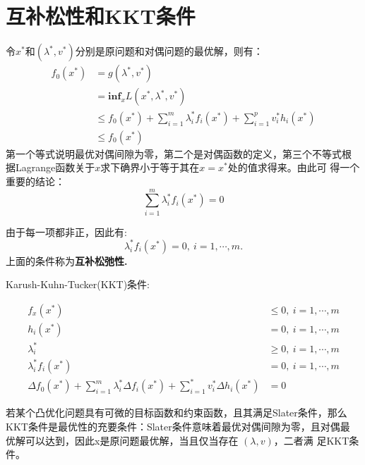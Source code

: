 \documentclass[fontset=none,oneside]{book}
\begin{document}
\section{互补松性和KKT条件}
令$x^{*}$和$(\lambda^{*},v^{*})$分别是原问题和对偶问题的最优解，则有：
\begin{equation}
\label{eq:17}
\begin{split}
f_{0}(x^{*})&=g(\lambda^{*},v^{*}) \\
       & = \mathbf{inf}_{x}L(x^{*},\lambda^{*},v^{*})\\
       & \leq
       f_{0}(x^{*})+\sum\limits_{i=1}^{m}\lambda_{i}^{*}f_{i}(x^{*})+\sum\limits_{i=1}^{p}v_{i}^{*}h_{i}(x^{*})
       \\
       & \leq f_{0}(x^{*})
\end{split}
\end{equation}
第一个等式说明最优对偶间隙为零，第二个是对偶函数的定义，第三个不等式根
据Lagrange函数关于$x$求下确界小于等于其在$x=x^{*}$处的值求得来。由此可
得一个重要的结论：
\begin{equation}
\label{eq:18}
\sum\limits_{i=1}^{m}\lambda_{i}^{*}f_{i}(x^{*})=0
\end{equation}
\begin{shaded}
由于每一项都非正，因此有:
\begin{equation}
\label{eq:19}
\lambda_{i}^{*}f_{i}(x^{*})=0,~i=1,\cdots,m.
\end{equation}
上面的条件称为{\bf{互补松弛性.}}
\end{shaded}

Karush-Kuhn-Tucker(KKT)条件:
\begin{shaded}
\begin{equation}
\label{eq:20}
\begin{split}
f_{x}(x^{*}) & \leq 0,~ i=1,\cdots,m \\
h_i(x^{*}) &=0,~ i=1,\cdots,m \\
\lambda_{i}^{*}&\geq 0,~i=1,\cdots,m \\
\lambda_{i}^{*}f_{i}(x^{*})&=0,~i=1,\cdots,m \\
\Delta f_{0}(x^{*})+\sum\limits_{i=1}^{m}\lambda_{i}^{*}\Delta
f_{i}(x^{*})+\sum\limits_{i=1}^{*}v_{i}^{*}\Delta h_{i}(x^{*})&=0
\end{split}
\end{equation}
\end{shaded}
若某个凸优化问题具有可微的目标函数和约束函数，且其满足Slater条件，那么
KKT条件是最优性的充要条件：Slater条件意味着最优对偶间隙为零，且对偶最
优解可以达到，因此x是原问题最优解，当且仅当存在 $(\lambda,v)$，二者满
足KKT条件。
\end{document}
